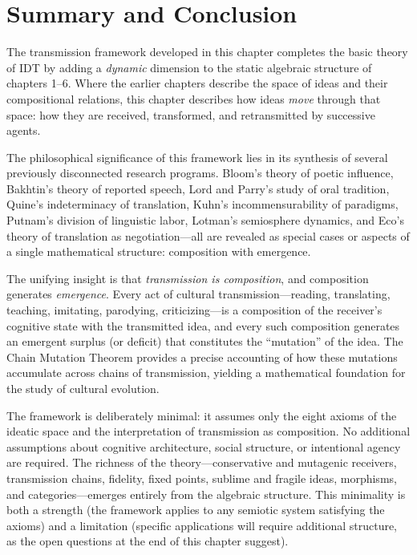 \section{Summary and Conclusion}

\begin{interpretation}\label{interp:ch7:cultural_evolution_theory}
The transmission framework developed in this chapter completes the
basic theory of IDT by adding a \emph{dynamic} dimension to the
static algebraic structure of chapters 1--6. Where the earlier chapters
describe the space of ideas and their compositional relations, this
chapter describes how ideas \emph{move} through that space: how they
are received, transformed, and retransmitted by successive agents.

The philosophical significance of this framework lies in its synthesis
of several previously disconnected research programs. Bloom's theory
of poetic influence, Bakhtin's theory of reported speech, Lord and
Parry's study of oral tradition, Quine's indeterminacy of translation,
Kuhn's incommensurability of paradigms, Putnam's division of linguistic
labor, Lotman's semiosphere dynamics, and Eco's theory of translation
as negotiation---all are revealed as special cases or aspects of a
single mathematical structure: composition with emergence.

The unifying insight is that \emph{transmission is composition}, and
composition generates \emph{emergence}. Every act of cultural
transmission---reading, translating, teaching, imitating, parodying,
criticizing---is a composition of the receiver's cognitive state with
the transmitted idea, and every such composition generates an emergent
surplus (or deficit) that constitutes the ``mutation'' of the idea.
The Chain Mutation Theorem provides a precise accounting of how these
mutations accumulate across chains of transmission, yielding a
mathematical foundation for the study of cultural evolution.

The framework is deliberately minimal: it assumes only the eight axioms
of the ideatic space and the interpretation of transmission as
composition. No additional assumptions about cognitive architecture,
social structure, or intentional agency are required. The richness of
the theory---conservative and mutagenic receivers, transmission chains,
fidelity, fixed points, sublime and fragile ideas, morphisms, and
categories---emerges entirely from the algebraic structure. This
minimality is both a strength (the framework applies to any semiotic
system satisfying the axioms) and a limitation (specific applications
will require additional structure, as the open questions at the end of
this chapter suggest).
\end{interpretation}

